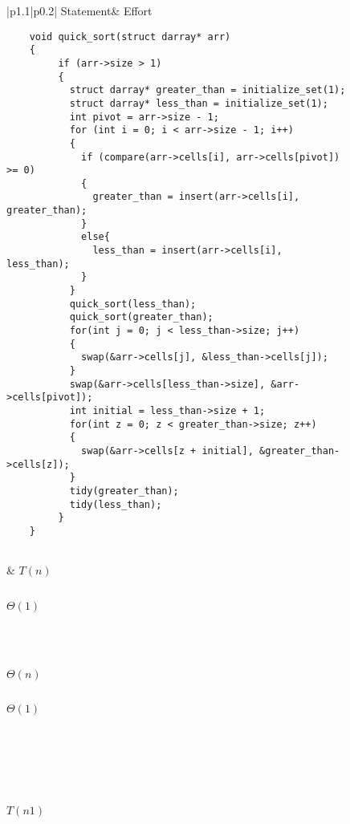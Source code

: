 \documentclass{article}
\begin{document}
\begin{center}
\begin{figure}[H]
\begin{tabular}{|p{}|p{}|}
\hline
Statement& Effort\\
\hline
    \begin{center}
    \begin{verbatim}
    void quick_sort(struct darray* arr)
    {
         if (arr->size > 1)
         {
           struct darray* greater_than = initialize_set(1);
           struct darray* less_than = initialize_set(1);
           int pivot = arr->size - 1;
           for (int i = 0; i < arr->size - 1; i++)
           {
             if (compare(arr->cells[i], arr->cells[pivot]) >= 0)
             {
               greater_than = insert(arr->cells[i], greater_than);
             }
             else{
               less_than = insert(arr->cells[i], less_than);
             }
           }
           quick_sort(less_than);
           quick_sort(greater_than);
           for(int j = 0; j < less_than->size; j++)
           {
             swap(&arr->cells[j], &less_than->cells[j]);
           }
           swap(&arr->cells[less_than->size], &arr->cells[pivot]);
           int initial = less_than->size + 1;
           for(int z = 0; z < greater_than->size; z++)
           {
             swap(&arr->cells[z + initial], &greater_than->cells[z]);
           }
           tidy(greater_than);
           tidy(less_than);
         }
    }


    \end{verbatim}
    \end{center}&
    $T(n)$
    $ $

    $ $

    $\Theta(1) $

    $ $

    $ $

    $ $

    $ $

    $\Theta(n)$

    $ $

    $\Theta(1) $

    $ $

    $ $

    $ $

    $ $

    $ $

    $ $

    $ $


    $T(n1)$


\end{tabular}
\end{figure}
\end{center}
\end{document}

